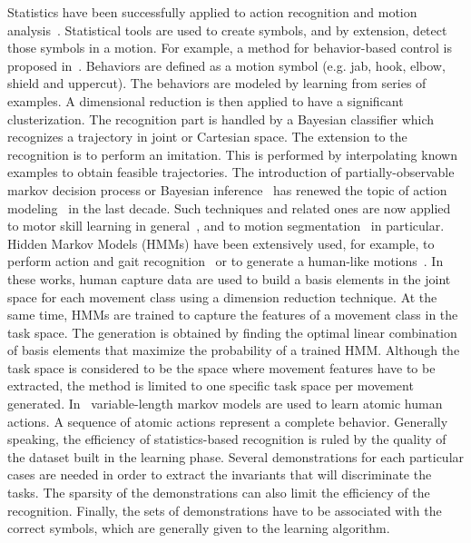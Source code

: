 \documentclass[journal]{IEEEtran}
\begin{document}
Statistics have been successfully applied
to action recognition and motion analysis~\cite{schaal03}.
Statistical tools are used to create symbols, and by extension, detect those
symbols in a motion. For example, a method for behavior-based control 
is proposed in~\cite{drumwright03, drumwright04}. Behaviors are defined 
as a motion symbol (e.g. jab, hook, elbow, shield and uppercut). 
The behaviors are modeled by learning from series of examples.
A dimensional reduction is then applied to have a significant
clusterization.  The recognition part is handled by a Bayesian classifier which
recognizes a trajectory in joint or Cartesian space. The extension to the recognition
is to perform an imitation. This is performed by interpolating known examples to obtain
feasible trajectories. 
The introduction of partially-observable markov decision process or Bayesian inference~\cite{pearl88} has
renewed the topic of action modeling~\cite{kaelbling98} in the last decade. Such
techniques and related ones are now applied to motor skill learning in
general~\cite{peters08}, and to motion segmentation~\cite{calinon10, inamura04} in particular. 
Hidden Markov Models (HMMs) have been extensively used,
for example, to perform action and gait recognition~\cite{gu10} or to generate 
a human-like motions~\cite{kwon08}. In these works, human capture data 
are used to build a basis elements in the joint space for each movement class 
using a dimension reduction technique. At the same time,
HMMs are trained to capture the features of a movement class in the task space. The generation
is obtained by finding the optimal linear combination of basis elements that maximize
the probability of a trained HMM. Although the task space is considered to be 
the space where movement features have to be extracted, the method is limited to one
specific task space per movement generated.
In~\cite{liang09} variable-length markov models are used to learn atomic human actions. A sequence
of atomic actions represent a complete behavior.
Generally speaking, the efficiency of statistics-based recognition is ruled by the quality of the dataset built
in the learning phase.
Several demonstrations for each particular cases are needed in order to extract
the invariants that will discriminate the tasks. The sparsity of the demonstrations
can also limit the efficiency of the recognition. Finally, the sets of demonstrations
have to be associated with the correct symbols, which are generally given to the learning algorithm.
\end{document}
